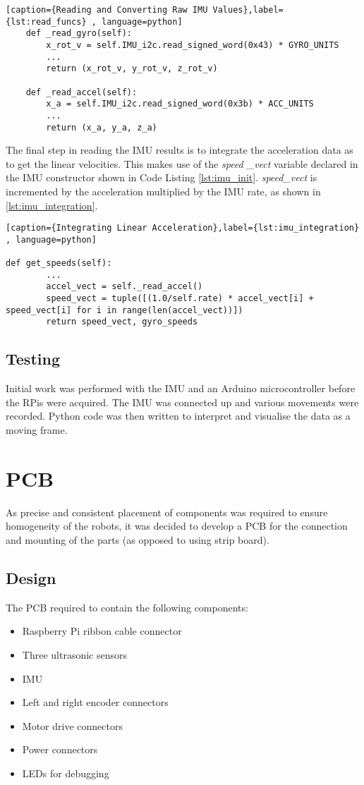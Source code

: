 \begin{lstlisting}[caption={Reading and Converting Raw IMU Values},label={lst:read_funcs} , language=python]
    def _read_gyro(self):
        x_rot_v = self.IMU_i2c.read_signed_word(0x43) * GYRO_UNITS
		...
        return (x_rot_v, y_rot_v, z_rot_v)

    def _read_accel(self):
        x_a = self.IMU_i2c.read_signed_word(0x3b) * ACC_UNITS
		...
        return (x_a, y_a, z_a)
\end{lstlisting}

The final step in reading the IMU results is to integrate the acceleration 
data as to get the linear velocities. This makes use of the \textit{speed
\_vect} variable declared in the IMU constructor shown in Code Listing 
\ref{lst:imu_init}. \textit{speed\_vect} is incremented by the 
acceleration multiplied by the IMU rate, as shown in 
\ref{lst:imu_integration}.

\begin{lstlisting}[caption={Integrating Linear Acceleration},label={lst:imu_integration} , language=python]

def get_speeds(self):
		...
        accel_vect = self._read_accel()
        speed_vect = tuple([(1.0/self.rate) * accel_vect[i] + speed_vect[i] for i in range(len(accel_vect))])
        return speed_vect, gyro_speeds
\end{lstlisting}


\subsection{Testing}\label{elec/imu/test}
Initial work was performed with the IMU and an Arduino microcontroller before the RPis were acquired. The IMU was connected up and various movements were recorded. Python code was then written to interpret and visualise the data as a moving frame.

\section{PCB}\label{elec/pcb}
As precise and consistent placement of components was required to ensure homogeneity of the robots, it was decided to develop a PCB for the connection and mounting of the parts (as opposed to using strip board).
\subsection{Design}\label{elec/pcb/design}
The PCB required to contain the following components:
\begin{itemize}
  \item Raspberry Pi ribbon cable connector
  \item Three ultrasonic sensors
  \item IMU
  \item Left and right encoder connectors
  \item Motor drive connectors
  \item Power connectors
  \item LEDs for debugging
\end{itemize}

